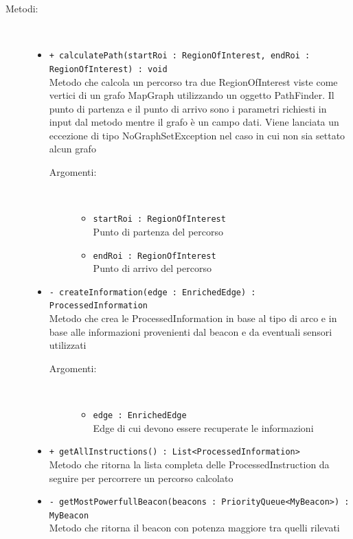 \documentclass[../DefinizioneDiProdotto.tex]{subfiles}
\begin{document}
\begin{description}
\begin{itemize}
\end{itemize}
\item[Metodi:] \
\begin{itemize}
\item \texttt{+ calculatePath(startRoi : RegionOfInterest, endRoi : RegionOfInterest) : void}\\
Metodo che calcola un percorso tra due RegionOfInterest viste come vertici di un grafo MapGraph utilizzando un oggetto PathFinder. Il punto di partenza e il punto di arrivo sono i parametri richiesti in input dal metodo mentre il grafo è un campo dati. Viene lanciata un eccezione di tipo NoGraphSetException nel caso in cui non sia settato alcun grafo
 \begin{description}
\item[Argomenti:] \
\begin{itemize}
\item \texttt{startRoi : RegionOfInterest}\\
Punto di partenza del percorso\item \texttt{endRoi : RegionOfInterest}\\
Punto di arrivo del percorso\end{itemize}
\end{description}
\item \texttt{- createInformation(edge : EnrichedEdge) : ProcessedInformation}\\
Metodo che crea le ProcessedInformation in base al tipo di arco e in base alle informazioni provenienti dal beacon e da eventuali sensori utilizzati
 \begin{description}
\item[Argomenti:] \
\begin{itemize}
\item \texttt{edge : EnrichedEdge}\\
Edge di cui devono essere recuperate le informazioni\end{itemize}
\end{description}
\item \texttt{+ getAllInstructions() : List<ProcessedInformation>}\\
Metodo che ritorna la lista completa delle ProcessedInstruction da seguire per percorrere un percorso calcolato
 \item \texttt{- getMostPowerfullBeacon(beacons : PriorityQueue<MyBeacon>) : MyBeacon}\\
Metodo che ritorna il beacon con potenza maggiore tra quelli rilevati
 \begin{description}

\end{description}
\end{itemize}
\end{description}
\end{document}
